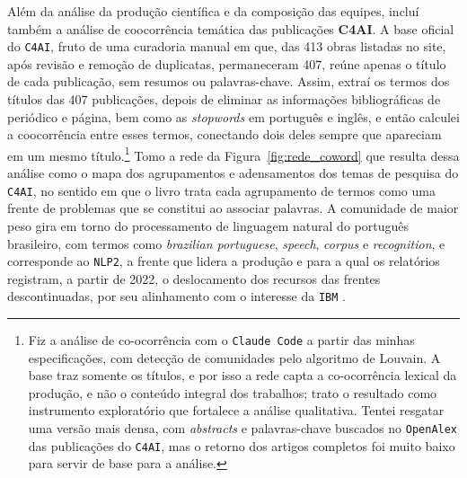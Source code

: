 Além da análise da produção científica e da composição das equipes, incluí também a análise de coocorrência temática das publicações \textbf{C4AI}. A base oficial do \texttt{C4AI}, fruto de uma curadoria manual em que, das 413 obras listadas no site, após revisão e remoção de duplicatas, permaneceram 407, reúne apenas o título de cada publicação, sem resumos ou palavras-chave. Assim, extraí os termos dos títulos das 407 publicações, depois de eliminar as informações bibliográficas de periódico e página, bem como as \emph{stopwords} em português e inglês, e então calculei a coocorrência entre esses termos, conectando dois deles sempre que apareciam em um mesmo título.\footnote{Fiz a análise de co-ocorrência com o \texttt{Claude Code} a partir das minhas especificações, com detecção de comunidades pelo algoritmo de Louvain. A base traz somente os títulos, e por isso a rede capta a co-ocorrência lexical da produção, e não o conteúdo integral dos trabalhos; trato o resultado como instrumento exploratório que fortalece a análise qualitativa. Tentei resgatar uma versão mais densa, com \emph{abstracts} e palavras-chave buscados no \texttt{OpenAlex} das publicações do \texttt{C4AI}, mas o retorno dos artigos completos foi muito baixo para servir de base para a análise.} Tomo a rede da Figura~\ref{fig:rede_coword} que resulta dessa análise como o mapa dos agrupamentos e adensamentos dos temas de pesquisa do \texttt{C4AI}, no sentido em que o livro trata cada agrupamento de termos como uma frente de problemas que se constitui ao associar palavras.  A comunidade de maior peso gira em torno do processamento de linguagem natural do português brasileiro, com termos como \emph{brazilian portuguese}, \emph{speech}, \emph{corpus} e \emph{recognition}, e corresponde ao \texttt{NLP2}, a frente que lidera a produção e para a qual os relatórios registram, a partir de 2022, o deslocamento dos recursos das frentes descontinuadas, por seu alinhamento com o interesse da \texttt{IBM} \parencite{C4AI2023, C4AI2025}. %